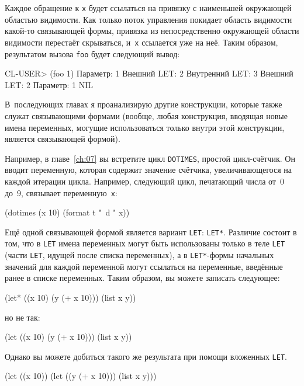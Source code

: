 Каждое обращение к \lstinline{x} будет ссылаться на привязку с наименьшей окружающей областью
видимости. Как только поток управления покидает область видимости какой-то связывающей
формы, привязка из непосредственно окружающей области видимости перестаёт скрываться,
и~\lstinline{x} ссылается уже на неё. Таким образом, результатом вызова \lstinline{foo} будет
следующий вывод:

\begin{myverb}
CL-USER> (foo 1)
Параметр: 1
Внешний LET: 2
Внутренний LET: 3
Внешний LET: 2
Параметр: 1
NIL
\end{myverb}

В~последующих главах я проанализирую другие конструкции, которые также служат связывающими
формами (вообще, любая конструкция, вводящая новые имена переменных, могущие
использоваться только внутри этой конструкции, является связывающей формой).

Например, в главе~\ref{ch:07} вы встретите цикл \lstinline{DOTIMES}, простой цикл-счётчик. Он
вводит переменную, которая содержит значение счётчика, увеличивающегося на каждой итерации
цикла. Например, следующий цикл, печатающий числа от~0 до~9, связывает переменную~\lstinline{x}:

\begin{myverb}
(dotimes (x 10) (format t "~d " x))
\end{myverb}

Ещё одной связывающей формой является вариант \lstinline{LET}: \lstinline{LET*}. Различие
состоит в том, что в \lstinline{LET} имена переменных могут быть использованы только в теле
\lstinline{LET} (части \lstinline{LET}, идущей после списка переменных), а в \lstinline{LET*}-формы
начальных значений для каждой переменной могут ссылаться на переменные, введённые ранее в
списке переменных. Таким образом, вы можете записать следующее:

\begin{myverb}
(let* ((x 10)
       (y (+ x 10)))
  (list x y))
\end{myverb}

\noindent{}но не так:

\begin{myverb}
(let ((x 10)
      (y (+ x 10)))
  (list x y))
\end{myverb}

Однако вы можете добиться такого же результата при помощи вложенных \lstinline{LET}.

\begin{myverb}
(let ((x 10))
  (let ((y (+ x 10)))
    (list x y)))
\end{myverb}

